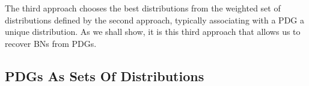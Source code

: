 \documentclass{article}
\numberwithin{equation}{section}
\begin{document}
The third approach chooses the best distributions from the weighted
set of distributions defined by the second approach, typically associating
with a PDG a unique distribution. As we shall show, it is this third
approach that allows us to recover BNs from PDGs. 

\subsection{PDGs As Sets Of Distributions}\label{sec:set-of-distribution-semantics} 
	
\end{document}
